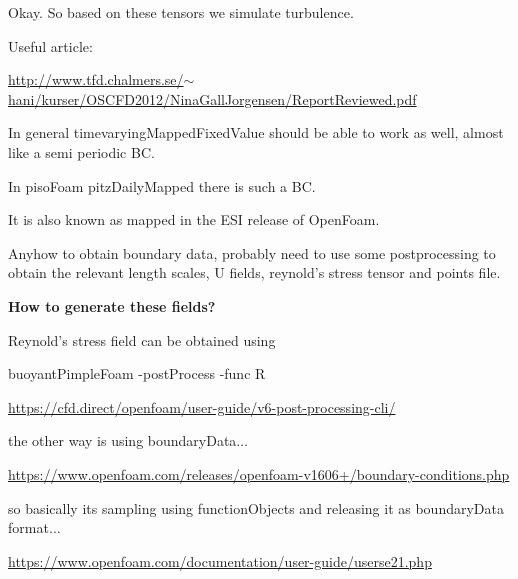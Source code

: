 \documentclass[12pt]{article}
\renewcommand{\_}{\kern-1.5pt\textunderscore\kern-1.5pt}
\begin{document}
Okay. So based on these tensors we simulate turbulence.\par

Useful article:\par

\href{http://www.tfd.chalmers.se/~hani/kurser/OS_CFD_2012/NinaGallJorgensen/ReportReviewed.pdf}{http://www.tfd.chalmers.se/$ \sim $ hani/kurser/OS\_CFD\_2012/NinaGallJorgensen/ReportReviewed.pdf}\par


\vspace{\baselineskip}
In general timevaryingMappedFixedValue should be able to work as well, almost like a semi periodic BC.\par

In pisoFoam pitzDailyMapped there is such a BC.\par

It is also known as mapped in the ESI release of OpenFoam.\par

Anyhow to obtain boundary data, probably need to use some postprocessing to obtain the relevant length scales, U fields, reynold’s stress tensor and points file.\par

\textbf{How to generate these fields?}\par

Reynold’s stress field can be obtained using\par

buoyantPimpleFoam -postProcess -func R\par

\href{https://cfd.direct/openfoam/user-guide/v6-post-processing-cli/}{https://cfd.direct/openfoam/user-guide/v6-post-processing-cli/}\par

the other way is using boundaryData$ \ldots $ \par

\href{https://www.openfoam.com/releases/openfoam-v1606+/boundary-conditions.php}{https://www.openfoam.com/releases/openfoam-v1606+/boundary-conditions.php}\par

so basically its sampling using functionObjects and releasing it as boundaryData format$ \ldots $ \par

\href{https://www.openfoam.com/documentation/user-guide/userse21.php}{https://www.openfoam.com/documentation/user-guide/userse21.php}\par
\end{document}
